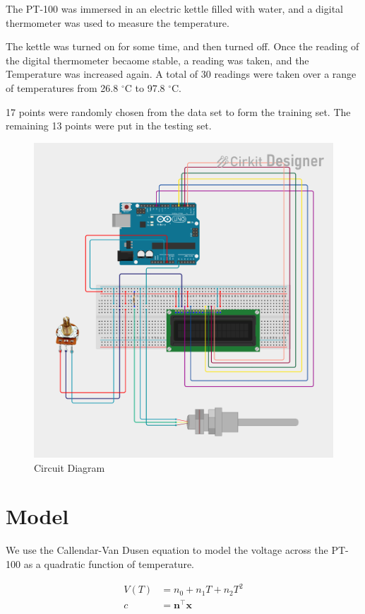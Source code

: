 \documentclass{article}
\let\vec\mathbf
\begin{document}
The PT-100 was immersed in an electric kettle filled with water, and a digital
thermometer was used to measure the temperature.

The kettle was turned on for some time, and then turned off. Once the reading of
the digital thermometer becaome stable, a reading was taken, and the Temperature
was increased again. A total of 30 readings were taken over a range of temperatures
from 26.8 $^\circ$C to 97.8 $^\circ$C.

17 points were randomly chosen from the data set to form the
training set. The remaining 13 points were put in the
testing set.

\begin{figure}
    \centering
    \includegraphics[width=1\linewidth]{figs/circuit_image.png}
    \caption{Circuit Diagram}
    \label{fig:placeholder}
\end{figure}
\newpage
\section{Model}

We use the Callendar-Van Dusen equation to model the voltage across the PT-100
as a quadratic function of temperature.

\begin{align}
    V(T) &= n_0 + n_1T + n_2T^2 \\
    c &= \vec{n}^\top \vec{x} \\
\end{align}
\end{document}
